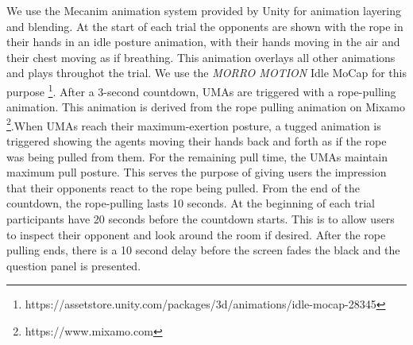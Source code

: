 We use the Mecanim animation system provided by Unity for animation layering and blending. At the start of each trial the opponents are shown with the rope in their hands in an idle posture animation, with their hands moving in the air and their chest moving as if breathing. This animation overlays all other animations and plays throughot the trial. We use the \textit{MORRO MOTION} Idle MoCap for this purpose \footnote{https://assetstore.unity.com/packages/3d/animations/idle-mocap-28345}. After a 3-second countdown, UMAs are triggered with a rope-pulling animation. This animation is derived from the rope pulling animation on Mixamo \footnote{https://www.mixamo.com}.When UMAs reach their maximum-exertion posture,  a tugged animation is triggered showing the agents moving their hands back and forth as if the rope was being pulled from them. For the remaining pull time, the UMAs maintain maximum pull posture. This serves the purpose of giving users the impression that their opponents react to the rope being pulled. From the end of the countdown, the rope-pulling lasts 10 seconds. At the beginning of each trial participants have 20 seconds before the countdown starts. This is to allow users to inspect their opponent and look around the room if desired. After the rope pulling ends, there is a 10 second delay before the screen fades the black and the question panel is presented. 
